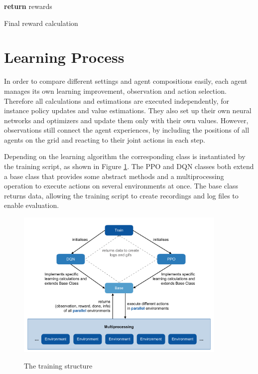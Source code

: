\begin{algorithm}[H]
    \DontPrintSemicolon
    \textbf{return} rewards\;
    \caption{Final reward calculation}\label{algo:final_reward}
\end{algorithm}


\section{Learning Process}\label{learning_process}
In order to compare different settings and agent compositions easily, each agent manages its own learning improvement, observation and action selection. Therefore all calculations and estimations are executed independently, for instance policy updates and value estimations. They also set up their own neural networks and optimizers and update them only with their own values. However, observations still connect the agent experiences, by including the positions of all agents on the grid and reacting to their joint actions in each step.

Depending on the learning algorithm the corresponding class is instantiated by the training script, as shown in Figure \ref{fig:training}. The PPO and DQN classes both extend a base class that provides some abstract methods and a multiprocessing operation to execute actions on several environments at once. The base class returns data, allowing the training script to create recordings and log files to enable evaluation.

\begin{figure}[hpbt]
    \centering
    \includegraphics[width=0.9\textwidth]{pictures/training}\\
    \caption[The Training Structure]{The training structure}\label{fig:training}
\end{figure}

